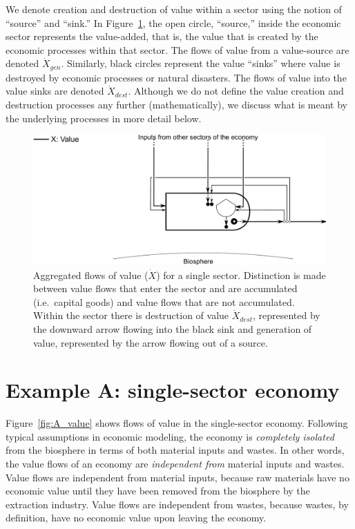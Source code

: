 We denote creation and destruction
of value within a sector using the notion of ``source'' and ``sink.''
In Figure~\ref{fig:basic_value_aggregated}, the open circle, 
``source,'' inside the economic sector represents the value-added,
that is, the value that is created by the economic processes within that sector. 
The flows of value from a value-source are denoted $\dot{X}_{gen}$. 
Similarly, black circles represent the value ``sinks''  where value is destroyed 
by economic  processes or natural disasters. 
The flows of value into the value sinks are denoted $\dot{X}_{dest}$. 
Although we do not define 
the value creation and destruction processes any further (mathematically), 
we discuss what is meant by the
underlying processes in more detail below.

\begin{figure}[!ht]
\centering
\includegraphics[width=\linewidth]{Part_2/Chapter_Values/images/PERKS_basic_unit_value.pdf}
\caption[Aggregated flows of value for a single sector]{Aggregated flows of value ($\dot{X}$) 
for a single sector. 
Distinction is made between value flows that 
enter the sector and are accumulated (i.e.\ capital goods) 
and value flows that are not accumulated. 
Within the sector there is destruction of value $\dot{X}_{dest}$, 
represented by the downward arrow flowing 
into the black sink and generation of value, 
represented by the arrow flowing out of a source. }
\label{fig:basic_value_aggregated} 
\end{figure}


\section{Example A: single-sector economy} %
\label{sec:value_example_A}

Figure~\ref{fig:A_value} shows flows of value in the single-sector economy.
Following typical assumptions in economic modeling, 
the economy is \emph{completely isolated} from the biosphere
in terms of both material inputs and wastes.
In other words, the value flows of an economy are \emph{independent from}
material inputs and wastes.
Value flows are independent from material inputs,
because raw materials have no economic value 
until they have been removed from the biosphere by the extraction industry.
Value flows are independent from wastes,
because wastes, by definition, have no economic value 
upon leaving the economy.

